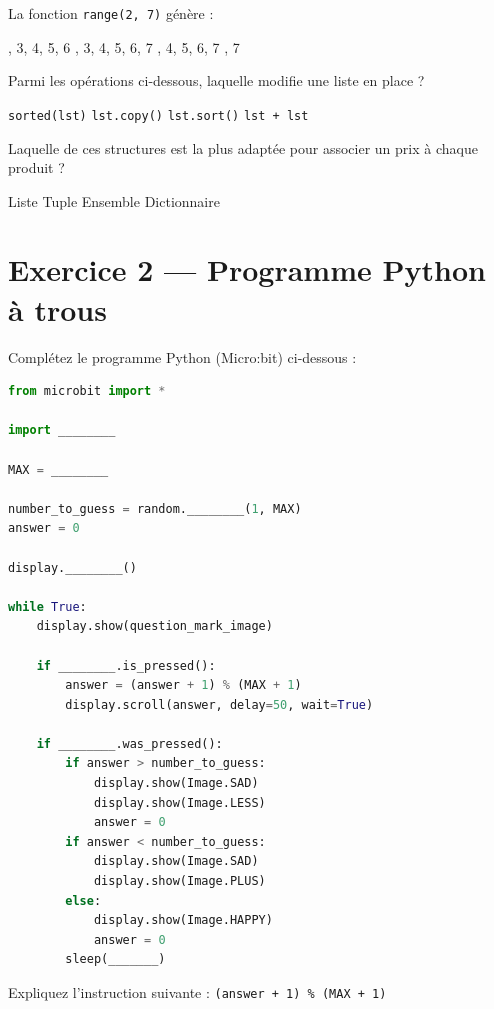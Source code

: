 \documentclass[11pt,a4paper]{exam}
\begin{document}
\begin{questions}
\question[1] La fonction \texttt{range(2, 7)} génère :
\begin{checkboxes}
  , 3, 4, 5, 6
  , 3, 4, 5, 6, 7
  , 4, 5, 6, 7
  , 7
\end{checkboxes}

\question[1] Parmi les opérations ci-dessous, laquelle modifie une liste en place ?
\begin{checkboxes}
  \choice \texttt{sorted(lst)}
  \choice \texttt{lst.copy()}
  \choice \texttt{lst.sort()}
  \choice \texttt{lst + lst}
\end{checkboxes}

\question[1] Laquelle de ces structures est la plus adaptée pour associer un prix à chaque produit ?
\begin{checkboxes}
  \choice Liste
  \choice Tuple
  \choice Ensemble
  \choice Dictionnaire
\end{checkboxes}

\end{questions}

\section*{Exercice 2 — Programme Python à trous}

\begin {questions}

\question[2] Complétez le programme Python (Micro:bit) ci-dessous :

\begin{lstlisting}[language=Python]
from microbit import *

import ________

MAX = ________

number_to_guess = random.________(1, MAX)
answer = 0

display.________()

while True:
    display.show(question_mark_image)
            
    if ________.is_pressed():
        answer = (answer + 1) % (MAX + 1)
        display.scroll(answer, delay=50, wait=True)

    if ________.was_pressed():
        if answer > number_to_guess:
            display.show(Image.SAD)
            display.show(Image.LESS)
            answer = 0
        if answer < number_to_guess:
            display.show(Image.SAD)
            display.show(Image.PLUS)
        else:
            display.show(Image.HAPPY)
            answer = 0
        sleep(_______)

\end{lstlisting}

\question[0.5] Expliquez l'instruction suivante : \verb|(answer + 1) % (MAX + 1)|

\end {questions}
\end{document}
